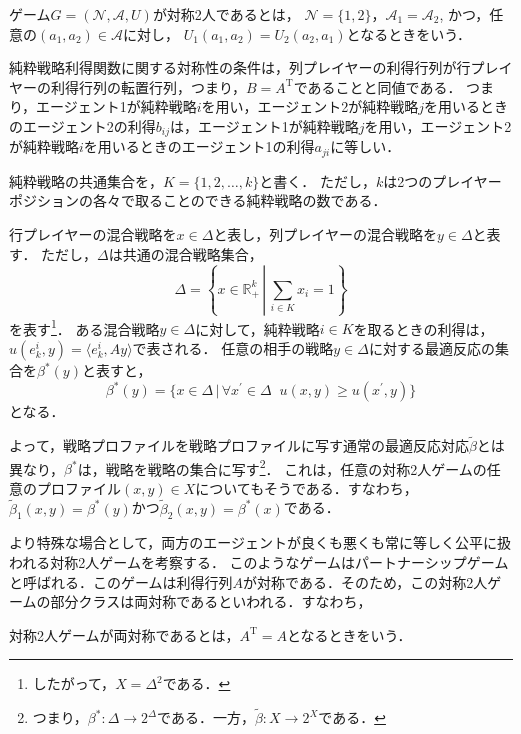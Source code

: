 \documentclass{jsreport}
\begin{document}
\begin{screen}
  \begin{defi}
    ゲーム$G = (\mathcal{N}, \mathcal{A}, U)$が対称2人であるとは，
    $\mathcal{N} = \{1, 2\}$，$\mathcal{A}_1 = \mathcal{A}_2$,
    かつ，任意の$(a_1, a_2) \in \mathcal{A}$に対し，
    $U_1(a_1, a_2) = U_2(a_2, a_1)$となるときをいう．
  \end{defi}
\end{screen}

純粋戦略利得関数に関する対称性の条件は，列プレイヤーの利得行列が行プレイヤーの利得行列の転置行列，つまり，$B = A^{\mathrm{T}}$であることと同値である．
つまり，エージェント1が純粋戦略$i$を用い，エージェント2が純粋戦略$j$を用いるときのエージェント2の利得$b_{ij}$は，エージェント1が純粋戦略$j$を用い，エージェント2が純粋戦略$i$を用いるときのエージェント1の利得$a_{ji}$に等しい．

純粋戦略の共通集合を，$K = \{1, 2, \ldots, k\}$と書く．
ただし，$k$は2つのプレイヤーポジションの各々で取ることのできる純粋戦略の数である．

行プレイヤーの混合戦略を$x \in \Delta$と表し，列プレイヤーの混合戦略を$y \in \Delta$と表す．
ただし，$\Delta$は共通の混合戦略集合，
\begin{equation}
  \Delta = \left\{x \in \mathbb{R}_{+}^{k} \, \left| \, \sum_{i \in K}x_i = 1\right.\right\} \nonumber
\end{equation}
を表す\footnote{したがって，$X = \Delta^2$である．}．
ある混合戦略$y \in \Delta$に対して，純粋戦略$i \in K$を取るときの利得は，$u(e_k^i, y) = \langle e_k^i, Ay \rangle$で表される．
任意の相手の戦略$y \in \Delta$に対する最適反応の集合を$\beta^{*}(y)$と表すと，
\begin{equation}
  \beta^{*}(y) = \{x \in \Delta \, | \, \forall x^{\prime} \in \Delta \; \; u(x, y) \geq u(x^{\prime}, y)\} \label{eq:betastar}
\end{equation}
となる．

よって，戦略プロファイルを戦略プロファイルに写す通常の最適反応対応$\tilde{\beta}$とは異なり，$\beta^{*}$は，戦略を戦略の集合に写す\footnote{つまり，$\beta^{*}: \Delta \to 2^{\Delta}$である．一方，$\tilde{\beta}: X \to 2^X$である．}．
これは，任意の対称2人ゲームの任意のプロファイル$(x, y) \in X$についてもそうである．すなわち，$\tilde{\beta}_1(x, y) = \beta^{*}(y)$かつ$\tilde{\beta}_2(x, y) = \beta^{*}(x)$である．

より特殊な場合として，両方のエージェントが良くも悪くも常に等しく公平に扱われる対称2人ゲームを考察する．
このようなゲームはパートナーシップゲームと呼ばれる．このゲームは利得行列$A$が対称である．そのため，この対称2人ゲームの部分クラスは両対称であるといわれる．すなわち，
\begin{screen}
  \begin{defi}
    対称2人ゲームが両対称であるとは，$A^{\mathrm{T}} = A$となるときをいう．
  \end{defi}
\end{screen}
\end{document}
